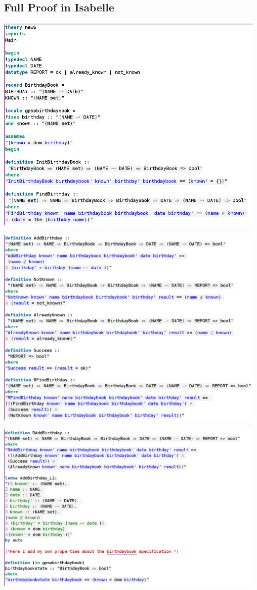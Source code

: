 \subsection{Full Proof in Isabelle}
\label{app:bb6}
\includegraphics[scale=0.4]{examples/bb/6imagea.png}

\noindent \includegraphics[scale=0.4]{examples/bb/6imageb.png}

\noindent \includegraphics[scale=0.4]{examples/bb/6imagec.png}

